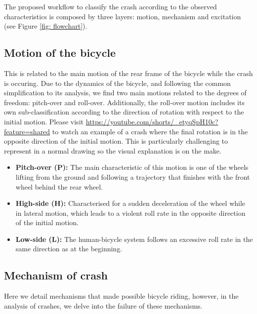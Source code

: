 \documentclass{article}
\begin{document}
The proposed workflow to classify the crash according to the observed characteristics is composed by three layers: motion, mechanism and excitation (see Figure \ref{fig: flowchart}).

\subsection{Motion of the bicycle}

This is related to the main motion of the rear frame of the bicycle while the crash is occuring.
%
Due to the dynamics of the bicycle, and following the common simplification to its analysis, we find two main motions related to the degrees of freedom: pitch-over and roll-over.
%
Additionally, the roll-over motion includes its own sub-classification according to the direction of rotation with respect to the initial motion.
% 
Please visit \url{https://youtube.com/shorts/_etyqSpH10c?feature=shared} to watch an example of a crash where the final rotation is in the opposite direction of the initial motion.
%
This is particularly challenging to represent in a normal drawing so the visual explanation is on the make.

\begin{itemize}
    \item \textbf{Pitch-over (P):} The main characteristic of this motion is one of the wheels lifting from the ground and following a trajectory that finishes with the front wheel behind the rear wheel.
    \item \textbf{High-side (H):} Characterised for a sudden deceleration of the wheel while in lateral motion, which leads to a violent roll rate in the opposite direction of the initial motion.
    \item \textbf{Low-side (L):} The human-bicycle system follows an excessive roll rate in the same direction as at the beginning.
\end{itemize}



\subsection{Mechanism of crash}

Here we detail mechanisms that made possible bicycle riding, however, in the analysis of crashes, we delve into the failure of these mechanisms.
\end{document}

